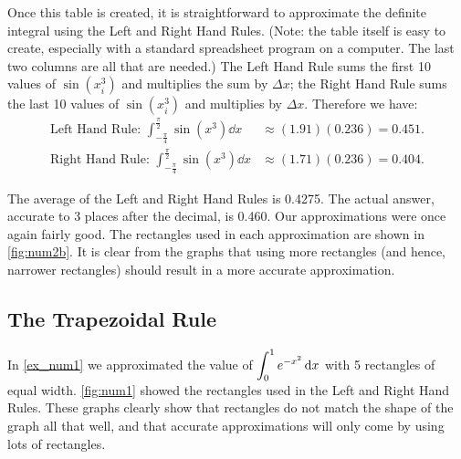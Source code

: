 \begin{example}
Once this table is created, it is straightforward to approximate the definite integral using the Left and Right Hand Rules. (Note: the table itself is easy to create, especially with a standard spreadsheet program on a computer. The last two columns are all that are needed.) The Left Hand Rule sums the first 10 values of $\sin(x_i^3)$ and multiplies the sum by $\Delta x$; the Right Hand Rule sums the last 10 values of $\sin(x_i^3)$ and multiplies by $\Delta x$. Therefore we have:
\begin{align*}
	\text{Left Hand Rule: }\int_{-\frac{\pi}4}^{\frac{\pi}2}\sin(x^3)\dd x
	& \approx (1.91)(0.236) = 0.451. \\
	\text{Right Hand Rule: }\int_{-\frac{\pi}4}^{\frac{\pi}2}\sin(x^3)\dd x
	&\approx (1.71)(0.236) = 0.404.
\end{align*}

The average of the Left and Right Hand Rules is 0.4275.  The actual answer, accurate to 3 places after the decimal, is 0.460. Our approximations were once again fairly good. The rectangles used in each approximation are shown in \autoref{fig:num2b}. It is clear from the graphs that using more rectangles (and hence, narrower rectangles) should result in a more accurate approximation.
\end{example}

\subsection{The Trapezoidal Rule}

In \autoref{ex_num1} we approximated the value of $\displaystyle \int_0^1 e^{-x^2}\operatorname{d}\! x$ with 5 rectangles of equal width. \autoref{fig:num1} showed the rectangles used in the Left and Right Hand Rules. These graphs clearly show that rectangles do not match the shape of the graph all that well, and that accurate approximations will only come by using lots of rectangles. 


